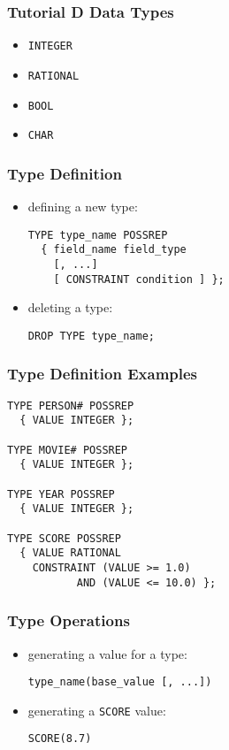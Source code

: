 \documentclass[dvipsnames]{beamer}
\theoremstyle{plain}
\begin{document}
\begin{frame}
  \frametitle{Tutorial D Data Types}

  \begin{itemize}
    \item \texttt{INTEGER}
    \item \texttt{RATIONAL}
    \item \texttt{BOOL}
    \item \texttt{CHAR}
  \end{itemize}
\end{frame}

\begin{frame}[fragile]
  \frametitle{Type Definition}

  \begin{itemize}
    \item defining a new type:
    \begin{lstlisting}
TYPE type_name POSSREP
  { field_name field_type
    [, ...]
    [ CONSTRAINT condition ] };
    \end{lstlisting}

    \item deleting a type:
    \begin{lstlisting}
DROP TYPE type_name;
    \end{lstlisting}
  \end{itemize}
\end{frame}

\begin{frame}[fragile]
  \frametitle{Type Definition Examples}

  \begin{lstlisting}
TYPE PERSON# POSSREP
  { VALUE INTEGER };

TYPE MOVIE# POSSREP
  { VALUE INTEGER };

TYPE YEAR POSSREP
  { VALUE INTEGER };

TYPE SCORE POSSREP
  { VALUE RATIONAL
    CONSTRAINT (VALUE >= 1.0)
           AND (VALUE <= 10.0) };
  \end{lstlisting}
\end{frame}

\begin{frame}[fragile]
  \frametitle{Type Operations}

  \begin{itemize}
    \item generating a value for a type:
    \begin{lstlisting}
type_name(base_value [, ...])
    \end{lstlisting}
  \end{itemize}

  \begin{example}
    \begin{itemize}
      \item generating a \texttt{SCORE} value:
      \begin{lstlisting}
SCORE(8.7)
      \end{lstlisting}
    \end{itemize}
  \end{example}
\end{frame}
\end{document}

